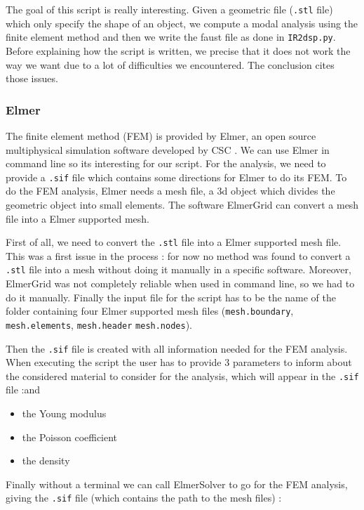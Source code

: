 The goal of this script is really interesting. Given a geometric file (\texttt{.stl} file) which only specify the shape of an object, we compute a modal analysis using the finite element method and then we write the faust file as done in \texttt{IR2dsp.py}. Before explaining how the script is written, we precise that it does not work the way we want due to a lot of difficulties we encountered. The conclusion cites those issues.

\subsubsection*{Elmer}

The finite element method (FEM) is provided by Elmer, an open source multiphysical simulation software developed by CSC \cite{elmerwebsite}. We can use Elmer in command line so its interesting for our script. For the analysis, we need to provide a \texttt{.sif} file which contains some directions for Elmer to do its FEM. To do the FEM analysis, Elmer needs a mesh file, a 3d object which divides the geometric object into small elements. The software ElmerGrid can convert a mesh file into a Elmer supported mesh.

First of all, we need to convert the \texttt{.stl} file into a Elmer supported mesh file. This was a first issue in the process : for now no method was found to convert a \texttt{.stl} file into a mesh without doing it manually in a specific software. Moreover, ElmerGrid was not completely reliable when used in command line, so we had to do it manually. Finally the input file for the script has to be the name of the folder containing four Elmer supported mesh files (\texttt{mesh.boundary}, \texttt{mesh.elements}, \texttt{mesh.header}  \texttt{mesh.nodes}).

Then the \texttt{.sif} file is created with all information needed for the FEM analysis. When executing the script the user has to provide 3 parameters to inform about the considered material to consider for the analysis, which will appear in the \texttt{.sif} file :and
\begin{itemize}
    \item the Young modulus
    \item the Poisson coefficient
    \item the density
\end{itemize}

Finally without a terminal we can call ElmerSolver to go for the FEM analysis, giving the \texttt{.sif} file (which contains the path to the mesh files) :

